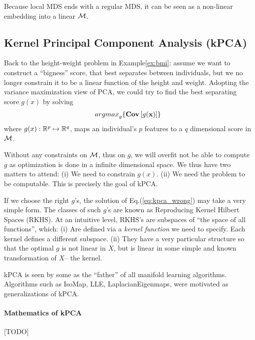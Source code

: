\documentclass[12pt,a4paper]{article}
\begin{document}
Because local MDS ends with a regular MDS, it can be seen as a non-linear embedding into a linear $\mathcal{M}$. 







\subsection{Kernel Principal Component Analysis (kPCA)}
\label{sec:kpca}

Back to the height-weight problem in Example\ref{ex:bmi}: assume we want to construct a ``bigness'' score, that best separates between individuals, but we no longer constrain it to be a linear function of the height and weight.
Adopting the variance maximization view of PCA, we could try to find the best separating score $g(x)$ by solving 
\begin{align}
\label{eq:kpca_wrong}
	\textstyle{\mathop{argmax}_{g}}\{ \mathbf{Cov} \left[ g(\mathbf{x}) \right] \}
\end{align}
where $g(x):\mathbb{R}^p \mapsto \mathbb{R}^q$, maps an individual's $p$ features to a $q$ dimensional score in $\mathcal{M}$.

Without any constraints on $\mathcal{M}$, thus on $g$, we will overfit \andor not be able to compute $g$ as optimization is done in a infinite dimensional space. 
We thus have two matters to attend:
(i) We need to constrain $g(x)$.
(ii) We need the problem to be computable.
This is precisely the goal of kPCA. 

If we choose the right $g$'s, the solution of Eq.(\ref{eq:kpca_wrong}) may take a very simple form. 
The classes of such $g$'s are known as Reproducing Kernel Hilbert Spaces (RKHS). 
At an intuitive level, RKHS's are subspaces of ``the space of all functions'', which:
(i) Are defined via a \emph{kernel function} we need to specify. Each kernel defines a different subspace. 
(ii) They have a very particular structure so that the optimal $g$ is not linear in $X$, but is linear in some simple and known transformation of $X$-- the kernel. 



\begin{remark}
	kPCA is seen by some as the ``father'' of all manifold learning algorithms. 
	Algorithms such as IsoMap, LLE, LaplacianEigenmaps, were motivated as generalizations of kPCA.
\end{remark}



\paragraph{Mathematics of kPCA}
[TODO]
\end{document}
